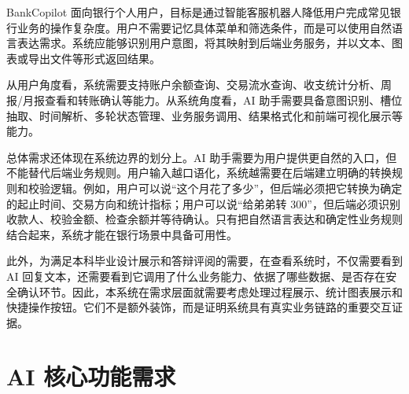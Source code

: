 \documentclass[bachelor, print]{xduthesis}
\begin{document}
BankCopilot 面向银行个人用户，目标是通过智能客服机器人降低用户完成常见银行业务的操作复杂度。用户不需要记忆具体菜单和筛选条件，而是可以使用自然语言表达需求。系统应能够识别用户意图，将其映射到后端业务服务，并以文本、图表或导出文件等形式返回结果。

从用户角度看，系统需要支持账户余额查询、交易流水查询、收支统计分析、周报/月报查看和转账确认等能力。从系统角度看，AI 助手需要具备意图识别、槽位抽取、时间解析、多轮状态管理、业务服务调用、结果格式化和前端可视化展示等能力。

总体需求还体现在系统边界的划分上。AI 助手需要为用户提供更自然的入口，但不能替代后端业务规则。用户输入越口语化，系统越需要在后端建立明确的转换规则和校验逻辑。例如，用户可以说“这个月花了多少”，但后端必须把它转换为确定的起止时间、交易方向和统计指标；用户可以说“给弟弟转 300”，但后端必须识别收款人、校验金额、检查余额并等待确认。只有把自然语言表达和确定性业务规则结合起来，系统才能在银行场景中具备可用性。

此外，为满足本科毕业设计展示和答辩评阅的需要，在查看系统时，不仅需要看到 AI 回复文本，还需要看到它调用了什么业务能力、依据了哪些数据、是否存在安全确认环节。因此，本系统在需求层面就需要考虑处理过程展示、统计图表展示和快捷操作按钮。它们不是额外装饰，而是证明系统具有真实业务链路的重要交互证据。

\section{AI 核心功能需求}
\end{document}
